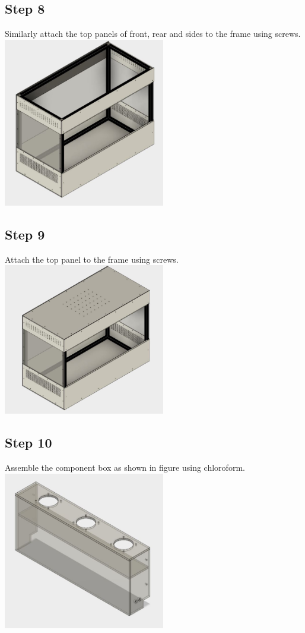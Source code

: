 \documentclass[a4paper,12pt,oneside]{book}
\begin{document}
\subsection*{Step 8}
Similarly attach the top panels of front, rear and sides to the frame using screws.\\
\includegraphics[width=200pt]{8}
\subsection*{Step 9}
Attach the top panel to the frame using screws.\\
\includegraphics[width=200pt]{9}
\subsection*{Step 10}
Assemble the component box as shown in figure using chloroform.\\
\includegraphics[width=200pt]{10}
\end{document}
